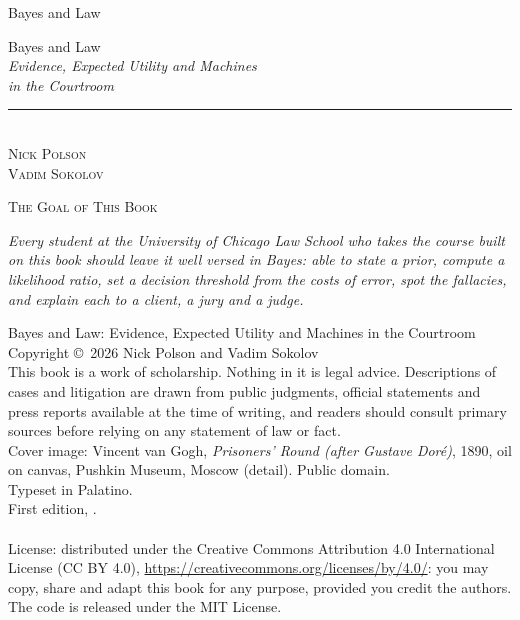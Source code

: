 \documentclass[11pt,openany,twoside]{book}
\begin{document}
\frontmatter
\pagestyle{empty}

\begin{center}
\vspace*{2.2in}
{\Huge\color{nightblue} Bayes and Law}\\[1.2em]
\end{center}
\clearpage

\begin{center}
\vspace*{1.2in}
{\Huge\color{nightblue} Bayes and Law}\\[1em]
{\Large\itshape Evidence, Expected Utility and Machines\\[0.2em] in the Courtroom}\\[0.6in]
{\color{starlight}\rule{2in}{0.8pt}}\\[0.6in]
{\Large\scshape Nick Polson}\\[0.6em]
{\Large\scshape Vadim Sokolov}\\
\vfill
\end{center}
\clearpage

\vspace*{2.0in}
\begin{center}
{\large\scshape The Goal of This Book}\\[1.2em]
\begin{minipage}{0.82\linewidth}\centering\itshape
Every student at the University of Chicago Law School who takes the course built on this book should leave it well versed in Bayes: able to state a prior, compute a likelihood ratio, set a decision threshold from the costs of error, spot the fallacies, and explain each to a client, a jury and a judge.
\end{minipage}
\end{center}
\clearpage

{\small
\vspace*{\fill}
\noindent Bayes and Law: Evidence, Expected Utility and Machines in the Courtroom\\[0.5em]
Copyright \copyright\ 2026 Nick Polson and Vadim Sokolov\\[0.5em]
This book is a work of scholarship. Nothing in it is legal advice. Descriptions of cases and litigation are drawn from public judgments, official statements and press reports available at the time of writing, and readers should consult primary sources before relying on any statement of law or fact.\\[0.5em]
Cover image: Vincent van Gogh, \emph{Prisoners' Round (after Gustave Dor\'e)}, 1890, oil on canvas, Pushkin Museum, Moscow (detail). Public domain.\\[0.5em]
Typeset in Palatino.\\[0.5em]
First edition, \BookYear.%
\ifx\BookDOIline\empty\else\\[0.5em]\BookDOIline\fi
\\[0.5em]License: distributed under the Creative Commons Attribution 4.0 International License (CC BY 4.0), \url{https://creativecommons.org/licenses/by/4.0/}: you may copy, share and adapt this book for any purpose, provided you credit the authors. The code is released under the MIT License.
}
\clearpage
\end{document}
